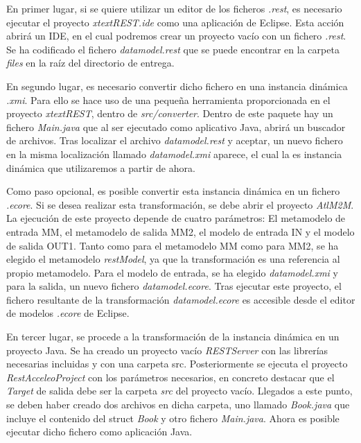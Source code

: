 \documentclass[runningheads]{llncs}
\begin{document}
En primer lugar, si se quiere utilizar un editor de los ficheros \textit{.rest}, es necesario ejecutar el proyecto \textit{xtextREST.ide} como una aplicación de Eclipse. Esta acción abrirá un IDE, en el cual podremos crear un proyecto vacío con un fichero \textit{.rest}. Se ha codificado el fichero \textit{datamodel.rest} que se puede encontrar en la carpeta \textit{files} en la raíz del directorio de entrega.

En segundo lugar, es necesario convertir dicho fichero en una instancia dinámica \textit{.xmi}. Para ello se hace uso de una pequeña herramienta proporcionada en el proyecto \textit{xtextREST}, dentro de \textit{src/converter}. Dentro de este paquete hay un fichero \textit{Main.java} que al ser ejecutado como aplicativo Java, abrirá un buscador de archivos. Tras localizar el archivo \textit{datamodel.rest} y aceptar, un nuevo fichero en la misma localización llamado \textit{datamodel.xmi} aparece, el cual la es instancia dinámica que utilizaremos a partir de ahora.

Como paso opcional, es posible convertir esta instancia dinámica en un fichero \textit{.ecore}. Si se desea realizar esta transformación, se debe abrir el proyecto \textit{AtlM2M}. La ejecución de este proyecto depende de cuatro parámetros: El metamodelo de entrada MM, el metamodelo de salida MM2, el modelo de entrada IN y el modelo de salida OUT1. Tanto como para el metamodelo MM como para MM2, se ha elegido el metamodelo \textit{restModel}, ya que la transformación es una referencia al propio metamodelo. Para el modelo de entrada, se ha elegido \textit{datamodel.xmi} y para la salida, un nuevo fichero \textit{datamodel.ecore}. Tras ejecutar este proyecto, el fichero resultante de la transformación \textit{datamodel.ecore} es accesible desde el editor de modelos \textit{.ecore} de Eclipse.

En tercer lugar, se procede a la transformación de la instancia dinámica en un proyecto Java. Se ha creado un proyecto vacío \textit{RESTServer} con las librerías necesarias incluidas y con una carpeta src. Posteriormente se ejecuta el proyecto \textit{RestAcceleoProject} con los parámetros necesarios, en concreto destacar que el \textit{Target} de salida debe ser la carpeta \textit{src} del proyecto vacío. Llegados a este punto, se deben haber creado dos archivos en dicha carpeta, uno llamado \textit{Book.java} que incluye el contenido del struct \textit{Book} y otro fichero \textit{Main.java}. Ahora es posible ejecutar dicho fichero como aplicación Java.
\end{document}
